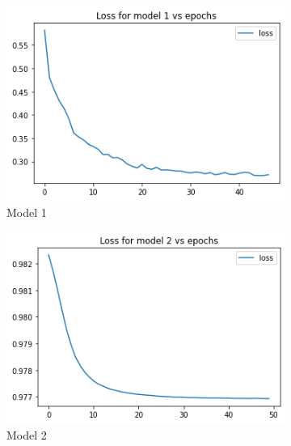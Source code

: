 \documentclass[12pt]{extarticle}
\begin{document}
\begin{figure}[h!]
     \centering
     \begin{subfigure}[b]{0.45\textwidth}
         \centering
         \includegraphics[width=\textwidth]{loss_model1.png}
         \caption{Model 1}
         \label{fig:loss_model1}
     \end{subfigure}
     \hfill
     \begin{subfigure}[b]{0.45\textwidth}
         \centering
         \includegraphics[width=\textwidth]{loss_model2.png}
         \caption{Model 2}
         \label{fig:loss_model2}
     \end{subfigure}
     \hfill
     \begin{subfigure}[b]{0.45\textwidth}
         \centering

\end{subfigure}
\end{figure}
\end{document}
